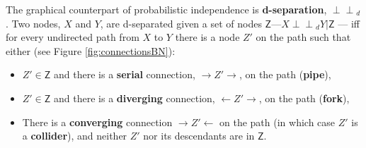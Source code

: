 \documentclass[
  10pt,
  dvipsnames,enabledeprecatedfontcommands]{scrartcl}
\newcommand{\indep}{\!\perp \!\!\! \perp\!}
\begin{document}
The graphical counterpart of probabilistic independence is
\textbf{d-separation}, \(\indep_d\). Two nodes, \(X\) and \(Y\), are
d-separated given a set of nodes
\(\mathsf{Z}\)---\(X\indep_d Y \vert \mathsf{Z}\) --- iff for every
undirected path from \(X\) to \(Y\) there is a node \(Z'\) on the path
such that either (see Figure \ref{fig:connectionsBN}):

\begin{itemize}

\item $Z' \in \mathsf{Z}$ and there is a \textbf{serial} connection, $\rightarrow Z' \rightarrow$, on the path (\textbf{pipe}),
\item  $Z'\in \mathsf{Z}$ and there is a \textbf{diverging} connection, $\leftarrow Z' \rightarrow $, on the path (\textbf{fork}),
\item There is a \textbf{converging} connection $\rightarrow Z' \leftarrow$ on the path (in which case $Z'$ is a \textbf{collider}), and neither $Z'$ nor its descendants are in $\mathsf{Z}$.
\end{itemize}

\vspace{1mm}
\end{document}
